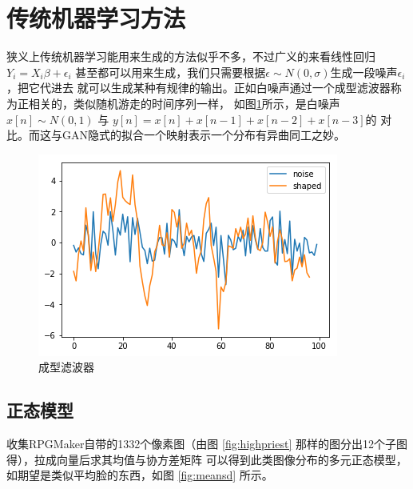 \documentclass[twocolumn,11pt]{ctexart}
\begin{document}
\section{传统机器学习方法}

狭义上传统机器学习能用来生成的方法似乎不多，不过广义的来看线性回归$Y_i = X_i \beta + \epsilon_i$
甚至都可以用来生成，我们只需要根据$\epsilon \sim N(0,\sigma)$生成一段噪声$\epsilon_i$，把它代进去
就可以生成某种有规律的输出。正如白噪声通过一个成型滤波器称为正相关的，类似随机游走的时间序列一样，
如图\ref{fig:shaping}所示，是白噪声 $x[n] \sim N(0,1)$ 与 $y[n] = x[n] + x[n-1] + x[n-2] +x[n-3]$的
对比。而这与GAN隐式的拟合一个映射表示一个分布有异曲同工之妙。

\begin{figure}[htb]
    \centering
    \includegraphics[width=0.6\linewidth]{shaping.png}
    \caption{成型滤波器}
    \label{fig:shaping}
\end{figure}


\subsection{正态模型}

收集RPGMaker自带的1332个像素图（由图 \ref{fig:highpriest} 那样的图分出12个子图得），拉成向量后求其均值与协方差矩阵
可以得到此类图像分布的多元正态模型，如期望是类似平均脸的东西，如图 \ref{fig:meansd} 所示。 
\end{document}

